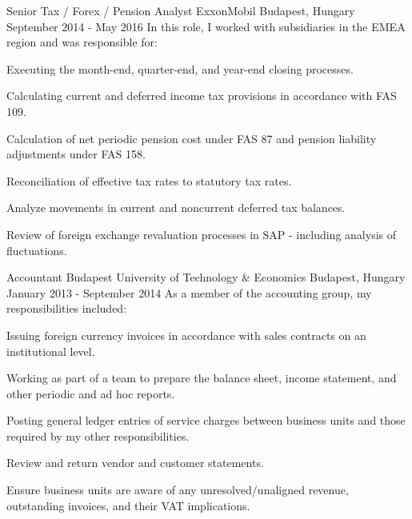 \begin{cventries}

  \cventry
    {Senior Tax / Forex / Pension Analyst} %
    {ExxonMobil} %
    {Budapest, Hungary} %
    {September 2014 - May 2016} %
    {In this role, I worked with subsidiaries in the EMEA region and was responsible for:} %
    {
      \begin{cvitems} %
        \item {Executing the month-end, quarter-end, and year-end closing processes.}
        \item {Calculating current and deferred income tax provisions in accordance with FAS 109.}
        \item {Calculation of net periodic pension cost under FAS 87 and pension liability adjustments under FAS 158.}
        \item {Reconciliation of effective tax rates to statutory tax rates.}
        \item {Analyze movements in current and noncurrent deferred tax balances.}
        \item {Review of foreign exchange revaluation processes in SAP - including analysis of fluctuations.}
      \end{cvitems}
  }


\cventry
{Accountant} %
{Budapest University of Technology \& Economics} %
{Budapest, Hungary} %
{January 2013 - September 2014} %
{As a member of the accounting group, my responsibilities included:} %
{
  \begin{cvitems} %
    \item {Issuing foreign currency invoices in accordance with sales contracts on an institutional level.}
    \item {Working as part of a team to prepare the balance sheet, income statement, and other periodic and ad hoc reports.}
    \item {Posting general ledger entries of service charges between business units and those required by my other responsibilities.}
    \item {Review and return vendor and customer statements.}
    \item {Ensure business units are aware of any unresolved/unaligned revenue, outstanding invoices, and their VAT implications.}
  \end{cvitems}
}


\end{cventries}
